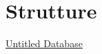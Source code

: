 \section{Strutture}\label{strutture}

\href{Untitled\%20Database\%20932194e3881041e4ba89a989dc61f43c.csv}{Untitled
Database}
